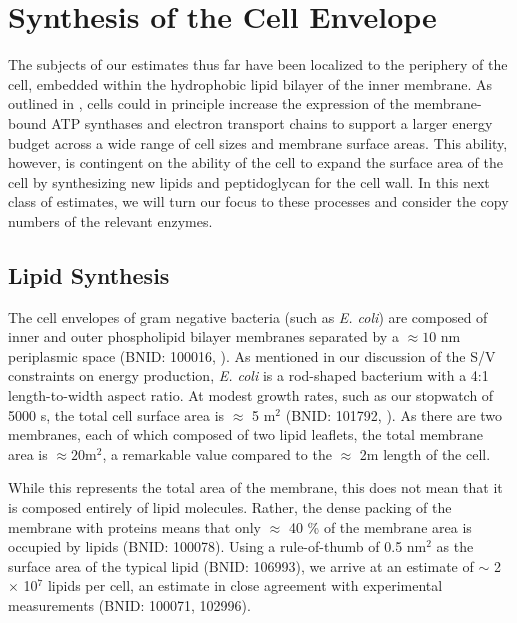 \section{Synthesis of the Cell Envelope}
The subjects of our estimates thus far have been localized to the periphery of
the cell, embedded within the hydrophobic lipid bilayer of the inner membrane.
As outlined in , cells could in principle increase the
expression of the membrane-bound ATP synthases and electron transport chains to
support a larger energy budget across a wide range of cell sizes and membrane
surface areas. This ability, however, is contingent on the ability of the cell
to expand the surface area of the cell by synthesizing new lipids and
peptidoglycan for the cell wall. In this next class of estimates, we will
turn our focus to these processes and consider the copy numbers of the relevant
enzymes.

\subsection{Lipid Synthesis}
The cell envelopes of gram negative bacteria (such as \textit{E. coli}) are
composed of inner and outer phospholipid bilayer membranes separated by a
$\approx 10$ nm periplasmic space (BNID: 100016, \cite{milo2010}). As mentioned
in our discussion of the S/V constraints on energy
production, \textit{E. coli} is a rod-shaped bacterium with a 4:1
length-to-width aspect ratio. At modest growth rates, such as our stopwatch of
5000 s, the total cell surface area is $\approx$ 5 \textmu m$^2$ (BNID: 101792,
\cite{milo2010}). As there are two membranes, each of which composed of two
lipid leaflets, the total membrane area is $\approx 20$\textmu m$^2$, a
remarkable value compared to the $\approx$ 2\textmu m length of the cell.

While this represents the total area of the membrane, this does not mean that it
is composed entirely of lipid molecules. Rather, the dense packing of the
membrane with proteins means that only $\approx$ 40 \% of the membrane area is
occupied by lipids (BNID: 100078). Using a rule-of-thumb of 0.5
nm$^2$ as the surface area of the typical lipid (BNID: 106993),
we arrive at an estimate of $\sim$ 2 $\times$ 10$^7$ lipids per cell, an
estimate in close agreement with experimental measurements (BNID: 100071,
102996).

